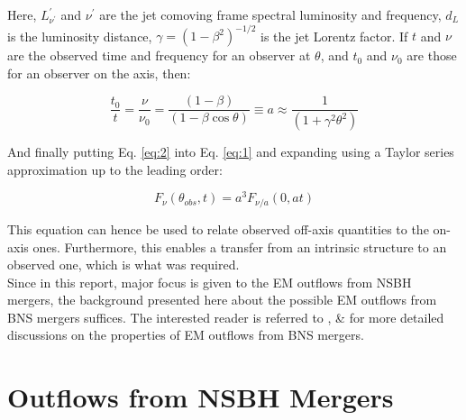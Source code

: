     Here, $L^{\prime}_{\nu^{\prime}}$ and $\nu^{\prime}$ are the jet comoving frame
    spectral luminosity and frequency, $d_L$ is the luminosity distance, $\gamma = (1 -
    \beta^2)^{-1/2}$ is the jet Lorentz factor. If $t$ and $\nu$ are the observed time
    and frequency  for an observer at $\theta$, and $t_0$ and $\nu_0$ are those for an
    observer on the axis, then:

    \begin{equation}
        \label{eq:2}
        \dfrac{t_0}{t} =
            \dfrac{\nu}{\nu_0}
                       =
            \dfrac{(1 - \beta)}{(1 - \beta \cos \theta)}
            \equiv a
            \approx \dfrac{1}{(1 + \gamma^2 \theta^2)}
    \end{equation}

    And finally putting Eq. \ref{eq:2} into Eq. \ref{eq:1} and expanding using a Taylor
    series approximation up to the leading order:

    \begin{equation}
        \label{eq:3}
        F_{\nu}(\theta_{obs}, t) = a^3 F_{\nu/a}(0, at)
    \end{equation}

    This equation can hence be used to relate observed off-axis quantities to the
    on-axis ones. Furthermore, this enables a transfer from an intrinsic structure to an
    observed one, which is what was required.\\
    Since in this report, major focus is given to the EM outflows from NSBH mergers, the
    background presented here about the possible EM outflows from BNS mergers suffices.
    The interested reader is referred to \cite{ioka_2019}, \cite{mohan_2019} \&
    \cite{lee_2007} for more detailed discussions on the properties of EM outflows from
    BNS mergers.

\section{Outflows from NSBH Mergers}\label{sec:nsbh}

